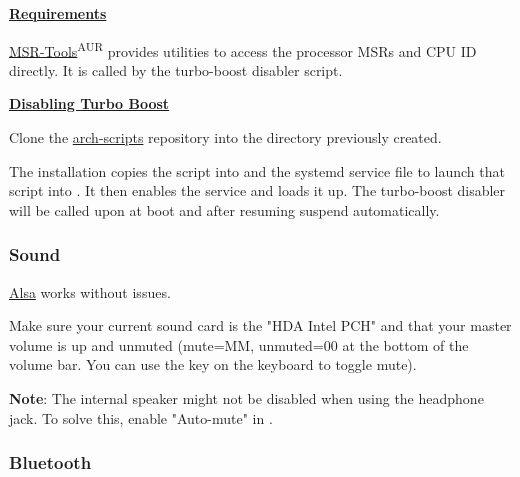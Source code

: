 \textbf{\textcolor{textgrey}{\uline{Requirements}}}

\href{https://01.org/msr-tools}{MSR-Tools}\textsuperscript{AUR} provides utilities to access the processor MSRs and CPU ID directly. It is called by the turbo-boost disabler script.


\vspace*{1em}
\textbf{\textcolor{textgrey}{\uline{Disabling Turbo Boost}}}

Clone the \href{https://github.com/An7ar35/arch-scripts}{arch-scripts} repository into the  directory previously created.

\begin{blocksection}
	The installation copies the  script into  and the systemd service file to launch that script into .\newline
	It then enables the service and loads it up. The turbo-boost disabler will be called upon at boot and after resuming suspend automatically.
\end{blocksection}

\subsubsection{Sound}

\href{https://wiki.archlinux.org/index.php/ALSA}{Alsa} works without issues.

\begin{blocksection}
	Make sure your current sound card is the "HDA Intel PCH" and that your master volume is up and unmuted (mute=MM, unmuted=00 at the bottom of the volume bar. You can use the  key on the keyboard to toggle mute).
\end{blocksection}

\vspace*{1em}
\textbf{Note}: The internal speaker might not be disabled when using the headphone jack. To solve this, enable "Auto-mute" in .

\subsubsection{Bluetooth}

